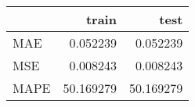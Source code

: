 \begin{tabular}{lrr}
\toprule
{} &      train &       test \\
\midrule
MAE  &   0.052239 &   0.052239 \\
MSE  &   0.008243 &   0.008243 \\
MAPE &  50.169279 &  50.169279 \\
\bottomrule
\end{tabular}
